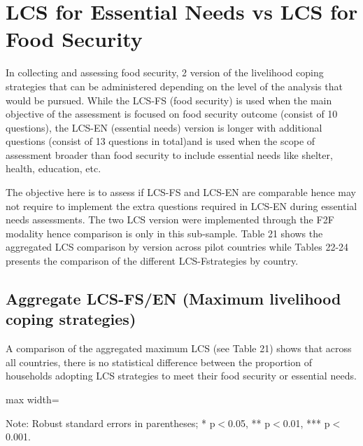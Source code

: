 \documentclass[11pt,harvard]{article}
\begin{document}
\pagebreak

\section{LCS for Essential Needs vs LCS for Food Security}

In collecting and assessing food security, 2 version of the livelihood coping strategies that can be administered depending on the level of the analysis that would be pursued. While the LCS-FS (food security) is used when the main objective of the assessment is focused on food security outcome (consist of 10 questions), the LCS-EN (essential needs) version is longer with additional questions (consist of 13 questions in total)and is used when the scope of assessment broader than food security to include essential needs like shelter, health, education, etc.
 
The objective here is to assess if LCS-FS and LCS-EN are comparable hence may not require to implement the extra questions required in LCS-EN during essential needs assessments. The two LCS version were implemented through the F2F modality hence comparison is only in this sub-sample. Table 21 shows the aggregated LCS comparison by version across pilot countries while Tables 22-24 presents the comparison of the different LCS-Fstrategies by country.

 
\subsection{Aggregate LCS-FS/EN (Maximum livelihood coping strategies)}

A comparison of the aggregated maximum LCS (see Table 21) shows that across all countries, there is no statistical difference between the proportion of households adopting LCS strategies to meet their food security or essential needs. 

\begin{table}[htbp]
	\centering
	\begin{adjustbox}{max width=\textwidth}
		\begin{threeparttable}
			\caption{Myanmar: LCS for Essential Needs vs. Food Security}
			\scriptsize
			 
			\label{tab:LCS_F2F_EN_FS_All_Country}
			\begin{tablenotes}
				\item Note: Robust standard errors in parentheses; * p$<$0.05, ** p$<$0.01, *** p$<$0.001. 
			\end{tablenotes}
		\end{threeparttable}
	\end{adjustbox}
\end{table}
\end{document}
